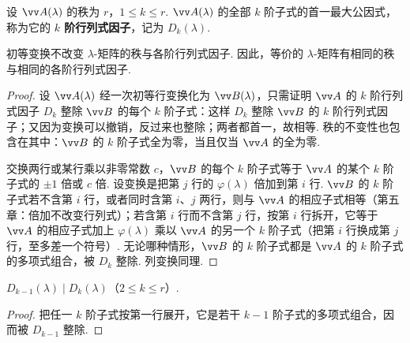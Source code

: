 	\begin{definition}
		设 $\vv A(\lambda)$ 的秩为 $r$，$1\le k\le r$. $\vv A(\lambda)$ 的全部 $k$ 阶子式的首一最大公因式，称为它的 \textbf{$k$ 阶行列式因子}，记为 $D_k(\lambda)$.
	\end{definition}
	
	\begin{theorem}\label{thm:detfactorinv}
		初等变换不改变 $\lambda$-矩阵的秩与各阶行列式因子. 因此，等价的 $\lambda$-矩阵有相同的秩与相同的各阶行列式因子.
	\end{theorem}
	\begin{proof}
		设 $\vv A(\lambda)$ 经一次初等行变换化为 $\vv B(\lambda)$，只需证明 $\vv A$ 的 $k$ 阶行列式因子 $D_k$ 整除 $\vv B$ 的每个 $k$ 阶子式：这样 $D_k$ 整除 $\vv B$ 的 $k$ 阶行列式因子；又因为变换可以撤销，反过来也整除；两者都首一，故相等. 秩的不变性也包含在其中：$\vv B$ 的 $k$ 阶子式全为零，当且仅当 $\vv A$ 的全为零.
		
		交换两行或某行乘以非零常数 $c$，$\vv B$ 的每个 $k$ 阶子式等于 $\vv A$ 的某个 $k$ 阶子式的 $\pm1$ 倍或 $c$ 倍. 设变换是把第 $j$ 行的 $\varphi(\lambda)$ 倍加到第 $i$ 行. $\vv B$ 的 $k$ 阶子式若不含第 $i$ 行，或者同时含第 $i$、$j$ 两行，则与 $\vv A$ 的相应子式相等（第五章：倍加不改变行列式）；若含第 $i$ 行而不含第 $j$ 行，按第 $i$ 行拆开，它等于 $\vv A$ 的相应子式加上 $\varphi(\lambda)$ 乘以 $\vv A$ 的另一个 $k$ 阶子式（把第 $i$ 行换成第 $j$ 行，至多差一个符号）. 无论哪种情形，$\vv B$ 的 $k$ 阶子式都是 $\vv A$ 的 $k$ 阶子式的多项式组合，被 $D_k$ 整除. 列变换同理.
	\end{proof}
	
	\begin{proposition}\label{prop:detfactordiv}
		$D_{k-1}(\lambda)\mid D_k(\lambda)$（$2\le k\le r$）.
	\end{proposition}
	\begin{proof}
		把任一 $k$ 阶子式按第一行展开，它是若干 $k-1$ 阶子式的多项式组合，因而被 $D_{k-1}$ 整除.
	\end{proof}
	
